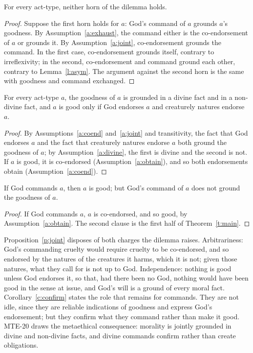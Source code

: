 \documentclass{situationist-preprint}
\begin{document}
\begin{theorem}\label{t:main}
For every act-type, neither horn of the dilemma holds.
\end{theorem}

\begin{proof}
Suppose the first horn holds for $a$: God's command of $a$ grounds $a$'s goodness. By Assumption~\ref{a:exhaust}, the command either is the co-endorsement of $a$ or grounds it. By Assumption~\ref{a:joint}, co-endorsement grounds the command. In the first case, co-endorsement grounds itself, contrary to irreflexivity; in the second, co-endorsement and command ground each other, contrary to Lemma~\ref{l:asym}. The argument against the second horn is the same with goodness and command exchanged.
\end{proof}

\begin{proposition}\label{p:joint}
For every act-type $a$, the goodness of $a$ is grounded in a divine fact and in a non-divine fact, and $a$ is good only if God endorses $a$ and creaturely natures endorse $a$.
\end{proposition}

\begin{proof}
By Assumptions~\ref{a:coend} and~\ref{a:joint} and transitivity, the fact that God endorses $a$ and the fact that creaturely natures endorse $a$ both ground the goodness of $a$; by Assumption~\ref{a:divine}, the first is divine and the second is not. If $a$ is good, it is co-endorsed (Assumption~\ref{a:obtain}), and so both endorsements obtain (Assumption~\ref{a:coend}).
\end{proof}

\begin{corollary}\label{c:confirm}
If God commands $a$, then $a$ is good; but God's command of $a$ does not ground the goodness of $a$.
\end{corollary}

\begin{proof}
If God commands $a$, $a$ is co-endorsed, and so good, by Assumption~\ref{a:obtain}. The second clause is the first half of Theorem~\ref{t:main}.
\end{proof}

Proposition~\ref{p:joint} disposes of both charges the dilemma raises. Arbitrariness: God's commanding cruelty would require cruelty to be co-endorsed, and so endorsed by the natures of the creatures it harms, which it is not; given those natures, what they call for is not up to God. Independence: nothing is good unless God endorses it, so that, had there been no God, nothing would have been good in the sense at issue, and God's will is a ground of every moral fact. Corollary~\ref{c:confirm} states the role that remains for commands. They are not idle, since they are reliable indications of goodness and express God's endorsement; but they confirm what they command rather than make it good. MTE-20 draws the metaethical consequence: morality is jointly grounded in divine and non-divine facts, and divine commands confirm rather than create obligations.
\end{document}
